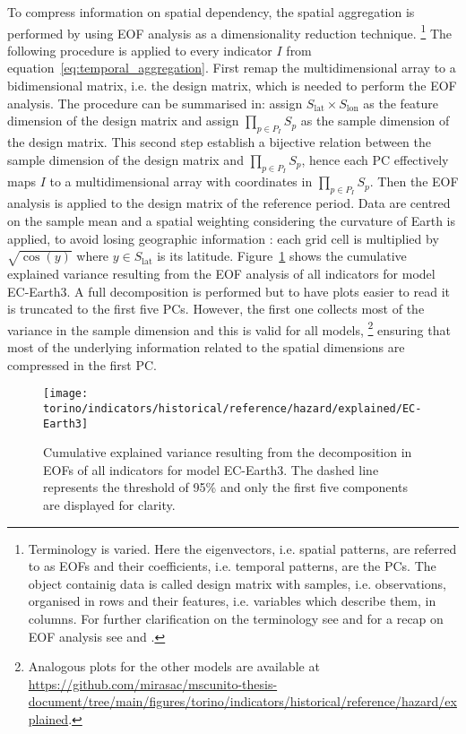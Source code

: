 To compress information on spatial dependency, the spatial aggregation is performed by using \gls{EOF} analysis as a dimensionality reduction technique.%
\footnote{Terminology is varied. Here the eigenvectors, i.e. spatial patterns, are referred to as \glspl{EOF} and their coefficients, i.e. temporal patterns, are the \glspl{PC}. The object containig data is called design matrix with samples, i.e. observations, organised in rows and their features, i.e. variables which describe them, in columns. For further clarification on the terminology see \cite[626-627]{2019WilksStatisticalMethods} and for a recap on \gls{EOF} analysis see \cite[6502-6503]{2009MonahanEmpiricalOrthogonal} and \cite[1121-1122]{2007HannachiEmpiricalOrthogonal}.}
The following procedure is applied to every \gls{indicator} $I$ from equation~\eqref{eq:temporal_aggregation}.
First remap the multidimensional array to a bidimensional matrix, i.e. the design matrix, which is needed to perform the \gls{EOF} analysis. The procedure can be summarised in: assign $S_\text{lat} \times S_\text{lon}$ as the feature dimension of the design matrix and assign $\prod_{p \in P_I} S_p$ as the sample dimension of the design matrix. This second step establish a bijective relation between the sample dimension of the design matrix and $\prod_{p \in P_I} S_p$, hence each \gls{PC} effectively maps $I$ to a multidimensional array with coordinates in $\prod_{p \in P_I} S_p$.
Then the \gls{EOF} analysis is applied to the design matrix of the reference period. Data are centred on the sample mean and a spatial weighting considering the curvature of Earth is applied, to avoid losing geographic information \cite{2009BaldwinSpatialWeighting}: each grid cell is multiplied by $\sqrt{\cos{(y)}}$ where $y \in S_\text{lat}$ is its latitude.
Figure~\ref{fig:explained_EC-Earth3} shows the cumulative explained variance resulting from the \gls{EOF} analysis of all indicators for model EC-Earth3. A full decomposition is performed but to have plots easier to read it is truncated to the first five \glspl{PC}. However, the first one collects most of the variance in the sample dimension and this is valid for all models,%
\footnote{Analogous plots for the other models are available at \url{https://github.com/mirasac/mscunito-thesis-document/tree/main/figures/torino/indicators/historical/reference/hazard/explained}.}
ensuring that most of the underlying information related to the spatial dimensions are compressed in the first \gls{PC}.
\begin{figure}[h]
  \centering
  \texttt{[image: torino/indicators/historical/reference/hazard/explained/EC-Earth3]}
  \caption{Cumulative explained variance resulting from the decomposition in \glspl{EOF} of all indicators for model EC-Earth3. The dashed line represents the threshold of 95\% and only the first five components are displayed for clarity.}
  \label{fig:explained_EC-Earth3}
\end{figure}

